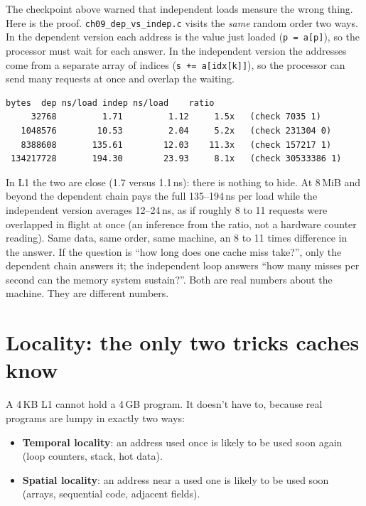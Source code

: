 \begin{example}
The checkpoint above warned that independent loads measure the wrong
thing. Here is the proof. \texttt{ch09\_dep\_vs\_indep.c} visits the
\emph{same} random order two ways. In the dependent version each address
is the value just loaded (\texttt{p = a[p]}), so the processor must wait
for each answer. In the independent version the addresses come from a
separate array of indices (\texttt{s += a[idx[k]]}), so the processor can
send many requests at once and overlap the waiting.

\begin{lstlisting}[language={},caption={Linux x86\_64 container,
\texttt{./ch09\_dep\_vs\_indep}: 20 million loads per row, same random
visiting order, dependent versus independent (4-byte elements).}]
     bytes  dep ns/load indep ns/load    ratio
     32768         1.71         1.12     1.5x   (check 7035 1)
   1048576        10.53         2.04     5.2x   (check 231304 0)
   8388608       135.61        12.03    11.3x   (check 157217 1)
 134217728       194.30        23.93     8.1x   (check 30533386 1)
\end{lstlisting}

In L1 the two are close (1.7 versus 1.1\,ns): there is nothing to hide.
At 8\,MiB and beyond the dependent chain pays the full 135--194\,ns per
load while the independent version averages 12--24\,ns, as if roughly
8 to 11 requests were overlapped in flight at once (an inference from
the ratio, not a hardware counter reading). Same data, same order, same
machine, an 8 to 11 times difference in the answer. If the question is
``how long does one cache miss take?'', only the dependent chain answers
it; the independent loop answers ``how many misses per second can the
memory system sustain?''. Both are real numbers about the machine.
They are different numbers.
\end{example}

\section{Locality: the only two tricks caches know}
\label{sec:locality09}

A 4\,KB L1 cannot hold a 4\,GB program. It doesn't have to, because
real programs are lumpy in exactly two ways:

\begin{itemize}
\item \textbf{Temporal locality}: an address used once is likely to
      be used soon again (loop counters, stack, hot data).
\item \textbf{Spatial locality}: an address near a used one is likely
      to be used soon (arrays, sequential code, adjacent fields).
\end{itemize}

